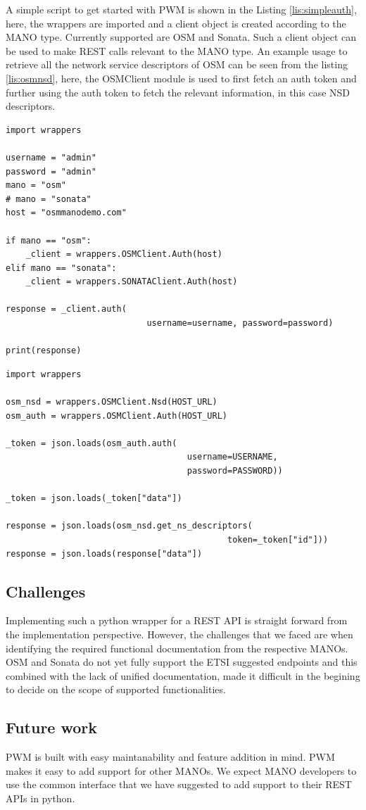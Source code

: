A simple script to get started with PWM is shown in the Listing \ref{lis:simpleauth}, here, the wrappers are imported and a client object is created according to the MANO type. 
Currently supported are OSM and Sonata. 
Such a client object can be used to make REST calls relevant to the MANO type. 
An example usage to retrieve all the network service descriptors of OSM can be seen from the listing \ref{lis:osmnsd}, here, the OSMClient module is used to first fetch an auth token and further using the auth token to fetch the relevant information, in this case NSD descriptors.


\begin{lstlisting}[caption=Simple wrapper code to fetch token, label=lis:simpleauth]
import wrappers

username = "admin"
password = "admin"
mano = "osm"
# mano = "sonata"
host = "osmmanodemo.com"

if mano == "osm":
	_client = wrappers.OSMClient.Auth(host)
elif mano == "sonata":
	_client = wrappers.SONATAClient.Auth(host)

response = _client.auth(
							username=username, password=password)

print(response)

\end{lstlisting}

\begin{lstlisting}[caption=Code to fetch all NSDs in OSM, label=lis:osmnsd]
import wrappers

osm_nsd = wrappers.OSMClient.Nsd(HOST_URL)
osm_auth = wrappers.OSMClient.Auth(HOST_URL)

_token = json.loads(osm_auth.auth(
									username=USERNAME,
									password=PASSWORD))

_token = json.loads(_token["data"])

response = json.loads(osm_nsd.get_ns_descriptors(
											token=_token["id"]))
response = json.loads(response["data"])
\end{lstlisting}

\subsection{Challenges}

Implementing such a python wrapper for a REST API is straight forward from the implementation perspective. 
However, the challenges that we faced are when identifying the required functional documentation from the respective MANOs. 
OSM and Sonata do not yet fully support the ETSI suggested endpoints and this combined with the lack of unified documentation, made it difficult in the begining to decide on the scope of supported functionalities.\\
  

\subsection{Future work}

PWM is built with easy maintanability and feature addition in mind. 
PWM makes it easy to add support for other MANOs. 
We expect MANO developers to use the common interface that we have suggested to add support to their REST APIs in python.

 
